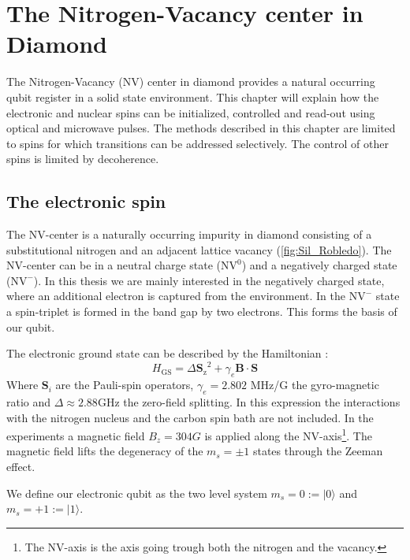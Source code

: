 \chapter{The Nitrogen-Vacancy center in Diamond}
The Nitrogen-Vacancy (NV) center in diamond provides a natural occurring qubit register in a solid state environment.
This chapter will explain how the electronic and nuclear spins can be initialized, controlled and read-out using optical and microwave pulses.
The methods described in this chapter are limited to spins for which transitions can be addressed selectively.
The control of other spins is limited by decoherence.

\section{The electronic spin}
The NV-center is a naturally occurring impurity in diamond consisting of a substitutional nitrogen and an adjacent lattice vacancy (\cref{fig:Sil_Robledo}).
The NV-center can be in a neutral charge state ($\mathrm{NV}^0$) and a negatively charged state ($\mathrm{NV}^-$).
In this thesis we are mainly interested in the negatively charged state, where an additional electron is captured from the environment.
In the $\mathrm{NV}^-$ state a spin-triplet is formed in the band gap by two electrons.
This forms the basis of our qubit.

The electronic ground state can be described by the Hamiltonian \citep{Bernien2014Control}:
 \begin{equation}
H_\mathrm{GS} = \Delta {\bm{S}_\mathrm{z}}^2 + \gamma_e \bm{B} \cdot \bm{S}
\end{equation}
Where $\bm{S}_i$ are the Pauli-spin operators,  $\gamma_e  = 2.802$ MHz/G  the gyro-magnetic ratio and $\Delta \approx 2.88 \mathrm{GHz}$ the zero-field splitting.
In this expression the interactions with the nitrogen nucleus and the carbon spin bath are not included.
In the experiments a magnetic field $B_z = 304G$ is applied along the NV-axis\footnote{The NV-axis is the axis going trough both the nitrogen and the vacancy. }.
The magnetic field lifts the degeneracy of the $m_s = \pm 1$ states through the Zeeman effect.

We define our electronic qubit  as the two level system  $m_s=0:=|0\rangle$ and $m_s = +1 := |1\rangle$.

